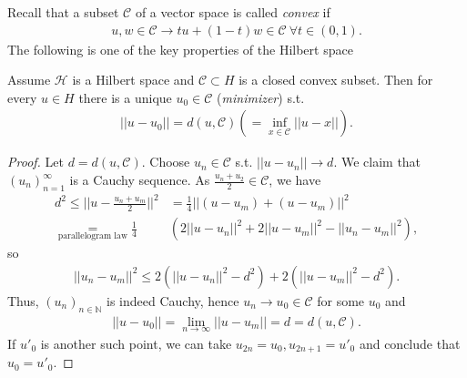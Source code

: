 Recall that a subset \(\mathcal{C}\) of a vector space is called \emph{convex} if 
\begin{align*}
    u,w\in\mathcal{C} \rightarrow tu + (1-t)w\in\mathcal{C} \ \forall t\in(0,1).
\end{align*}
The following is one of the key properties of the Hilbert space
\begin{theorem}
    Assume \(\mathcal{H}\) is a Hilbert space and \(\mathcal{C}\subset H\) is a closed convex subset. Then for every \(u\in H\) there is a unique 
    \(u_0\in\mathcal{C}\) (\emph{minimizer}) s.t.
    \begin{align*}
        ||u-u_0|| = d(u,\mathcal{C})(=\inf\limits_{x\in\mathcal{C}} ||u-x||).
    \end{align*}
\end{theorem}
\ifdetailed 
\begin{proof}
    Let \(d=d(u,\mathcal{C})\). Choose \(u_n\in\mathcal{C}\) s.t. \(||u-u_n||\rightarrow d\). We claim that \((u_n)^{\infty}_{n=1}\) is a 
    Cauchy sequence. As \(\frac{u_n+u_2}{2}\in\mathcal{C}\), we have 
    \begin{align*}
        d^2\leq ||u-\frac{u_n+u_m}{2}||^2 &= \frac{1}{4}||(u-u_m)+(u-u_m)||^2 \\
        \underset{\text{parallelogram law}}{=} \frac{1}{4}&\left(2||u-u_n||^2 + 2||u-u_m||^2 - ||u_n-u_m||^2\right),
    \end{align*}
    so 
    \begin{align*}
        ||u_n-u_m||^2 \leq 2\left( ||u-u_n||^2 - d^2 \right) + 2\left( ||u-u_m||^2 - d^2 \right).
    \end{align*}
    Thus, \((u_n)_{n\in\mathbb{N}}\) is indeed Cauchy, hence \(u_n\rightarrow u_0\in\mathcal{C}\) for some \(u_0\) and
    \begin{align*}
        ||u-u_0|| = \lim\limits_{n\rightarrow\infty} ||u-u_m|| = d = d(u,\mathcal{C}).
    \end{align*}
    If \(u'_0\) is another such point, we can take \(u_{2n}=u_0, u_{2n+1}=u'_0\) and conclude that \(u_0 = u'_0\).
\end{proof}
\fi 
